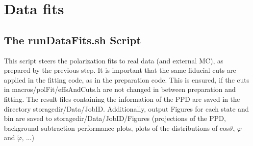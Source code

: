 \documentclass{article}
\begin{document}
\section{Data fits}
\subsection{The runDataFits.sh Script}

This script steers the polarization fits to real data (and external MC), as prepared by the previous step. It is important that the same fiducial cuts are applied in the fitting code, as in the preparation code. This is ensured, if the cuts in macros/polFit/effsAndCuts.h are not changed in between preparation and fitting. The result files containing the information of the PPD are saved in the directory storagedir/Data/JobID.
Additionally, output Figures for each state and bin are saved to storagedir/Data/JobID/Figures (projections of the PPD, background subtraction performance plots, plots of the distributions of cos$\vartheta$, $\varphi$ and $\tilde{\varphi}$, ...)
\end{document}
